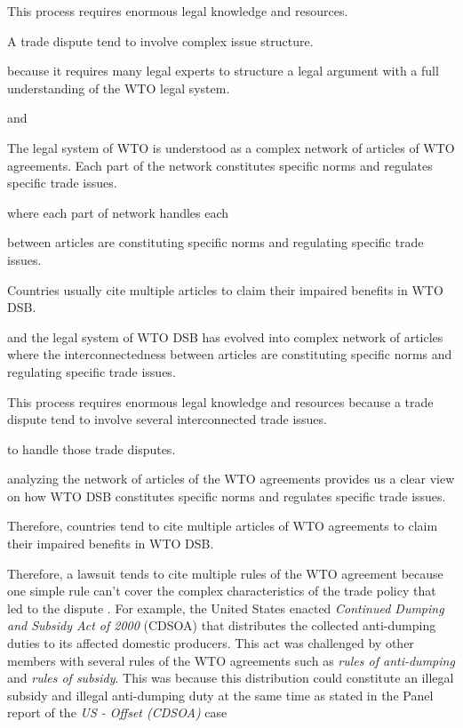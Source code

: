 This process requires enormous legal knowledge and resources.


A trade dispute tend to involve complex issue structure.


because it requires many legal experts to structure a legal argument with a full understanding of the WTO legal system.


and 

The legal system of WTO is understood as a complex network of articles of WTO agreements.
Each part of the network constitutes specific norms and regulates specific trade issues.




where each part of network handles each 


between articles are constituting specific norms and regulating specific trade issues.


Countries usually cite multiple articles to claim their impaired benefits in WTO DSB.

and the legal system of WTO DSB has evolved into complex network of articles where the interconnectedness between articles are constituting specific norms and regulating specific trade issues.

This process requires enormous legal knowledge and resources because a trade dispute tend to involve several interconnected trade issues.

to handle those trade disputes.

analyzing the network of articles of the WTO agreements provides us a clear view on how WTO DSB constitutes specific norms and regulates specific trade issues.


Therefore, countries tend to cite multiple articles of WTO agreements to claim their impaired benefits in WTO DSB.



Therefore, a lawsuit tends to cite multiple rules of the WTO agreement because one simple rule can't cover the complex characteristics of the trade policy that led to the dispute \citep{palmeter2004dispute}.
For example, the United States enacted \textit{Continued Dumping and Subsidy Act of 2000} (CDSOA) that distributes
the collected anti-dumping duties to its affected domestic producers.
This act was challenged by other members with several rules of
the WTO agreements such as \textit{rules of anti-dumping} and \textit{rules of subsidy}. This was because
this distribution could constitute an illegal subsidy and illegal anti-dumping duty at the same time as stated in the Panel report of the \textit{US - Offset (CDSOA)} case%

